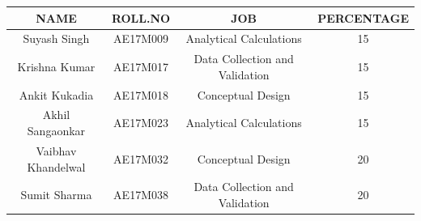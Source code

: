 \begin{titlepage}
	
	
	
	\vfill %
	
\begin{table}[h!]
 \begin{center}
 \begin{tabular}{|c| c |c |c|} 
 \hline
 NAME & ROLL.NO & JOB & PERCENTAGE \\ [0.5ex] 
 \hline
 Suyash Singh & AE17M009 & Analytical Calculations& 15 \\ 
 \hline
  Krishna Kumar & AE17M017  & Data Collection and Validation & 15 \\
 \hline
 Ankit Kukadia & AE17M018  & Conceptual Design & 15 \\
 \hline
 Akhil Sangaonkar & AE17M023 &Analytical Calculations & 15 \\ 
 \hline
 Vaibhav Khandelwal & AE17M032 & Conceptual Design & 20 \\ 
 \hline
 Sumit Sharma & AE17M038 & Data Collection and Validation & 20 \\ 
 \hline
\end{tabular}
\end{center}

\end{table}
	
	
	
	
\end{titlepage}



